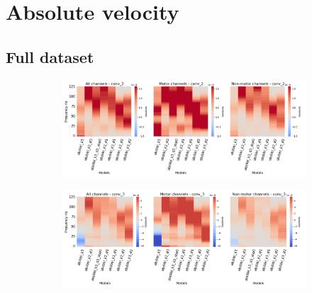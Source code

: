 \clearpage
\section*{Absolute velocity}\label{sec:absolute-velocity-appendixD}

\subsection*{Full dataset}\label{subsec:absVel-full-dataset-appendixD}
\begin{figure}[!htpb]
\centering
\begin{subfigure}[b]{\textwidth}
   \includegraphics[width=1\linewidth]{img/appendix/D/conv-2/m/absVel_model_gradients_all_kinds}
   \caption{}
   \label{fig:absVel-pw-full-grads-conv-2}
\end{subfigure}

\begin{subfigure}[b]{\textwidth}
   \includegraphics[width=1\linewidth]{img/appendix/D/conv-3/m/absVel_model_gradients_all_kinds}
   \caption{}
   \label{fig:absVel-pw-full-grads-conv-3}
\end{subfigure}
\end{figure}
\clearpage   

